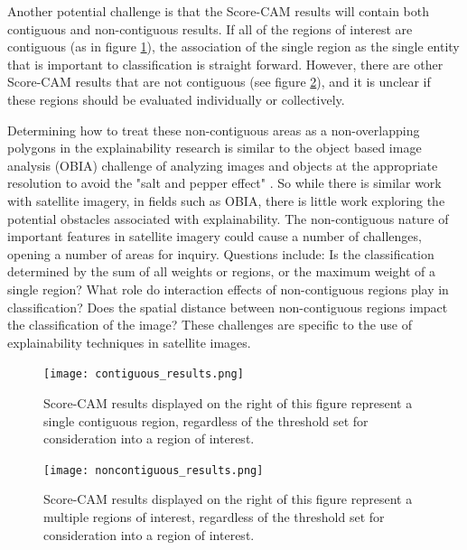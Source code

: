 Another potential challenge is that the Score-CAM results will contain both contiguous and non-contiguous results.  If all of the regions of interest are contiguous (as in figure \ref{fig:contiguous_ScoreCAM}), the association of the single region as the single entity that is important to classification is straight forward.  However, there are other Score-CAM results that are not contiguous (see figure \ref{fig:noncontiguous_ScoreCAM}), and it is unclear if these regions should be evaluated individually or collectively.  

Determining how to treat these non-contiguous areas as a non-overlapping polygons in the explainability research is similar to the object based image analysis (OBIA) challenge of analyzing images and objects at the appropriate resolution to avoid the "salt and pepper effect" \citep{blaschke2010object}.  So while there is similar work with satellite imagery, in fields such as OBIA, there is little work exploring the potential obstacles associated with explainability.  The non-contiguous nature of important features in satellite imagery could cause a number of challenges, opening a number of areas for inquiry.  Questions include: 
Is the classification determined by the sum of all weights or regions, or the maximum weight of a single region?
What role do interaction effects of non-contiguous regions play in classification?
Does the spatial distance between non-contiguous regions impact the classification of the image?
These challenges are specific to the use of explainability techniques in satellite images.


\begin{figure}
    \centering
    \texttt{[image: contiguous\_results.png]}
    \caption{Score-CAM results displayed on the right of this figure represent a single contiguous region, regardless of the threshold set for consideration into a region of interest.}
    \label{fig:contiguous_ScoreCAM}
\end{figure}

\begin{figure}
    \centering
    \texttt{[image: noncontiguous\_results.png]}
    \caption{Score-CAM results displayed on the right of this figure represent a multiple regions of interest, regardless of the threshold set for consideration into a region of interest.}
    \label{fig:noncontiguous_ScoreCAM}
\end{figure}

